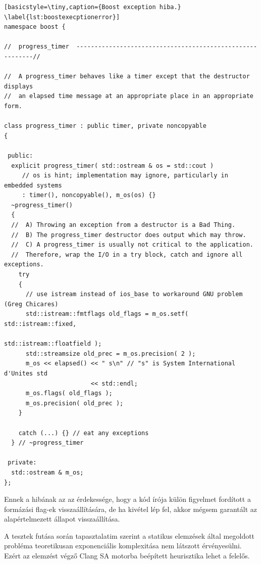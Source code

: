 \documentclass[a4paper,12pt]{report}
\begin{document}
\begin{minipage}{\linewidth}
\begin{lstlisting}[basicstyle=\tiny,caption={Boost exception hiba.}
\label{lst:boostexecptionerror}]
namespace boost {

//  progress_timer  ----------------------------------------------------------//

//  A progress_timer behaves like a timer except that the destructor displays
//  an elapsed time message at an appropriate place in an appropriate form.

class progress_timer : public timer, private noncopyable
{

 public:
  explicit progress_timer( std::ostream & os = std::cout )
     // os is hint; implementation may ignore, particularly in embedded systems
     : timer(), noncopyable(), m_os(os) {}
  ~progress_timer()
  {
  //  A) Throwing an exception from a destructor is a Bad Thing.
  //  B) The progress_timer destructor does output which may throw.
  //  C) A progress_timer is usually not critical to the application.
  //  Therefore, wrap the I/O in a try block, catch and ignore all exceptions.
    try
    {
      // use istream instead of ios_base to workaround GNU problem (Greg Chicares)
      std::istream::fmtflags old_flags = m_os.setf( std::istream::fixed,
                                                   std::istream::floatfield );
      std::streamsize old_prec = m_os.precision( 2 );
      m_os << elapsed() << " s\n" // "s" is System International d'Unites std
                        << std::endl;
      m_os.flags( old_flags );
      m_os.precision( old_prec );
    }

    catch (...) {} // eat any exceptions
  } // ~progress_timer

 private:
  std::ostream & m_os;
}; 
\end{lstlisting}
\end{minipage}

Ennek a hibának az az érdekessége, hogy a kód írója külön figyelmet fordított a formázási flag-ek visszaállítására, de ha kivétel lép fel, akkor mégsem garantált az alapértelmezett állapot visszaállítása.

A tesztek futása során tapasztalatim szerint a statikus elemzések által megoldott probléma teoretikusan exponenciális komplexitása nem látszott érvényesülni. Ezért az elemzést végző Clang SA motorba beépített heurisztika lehet a felelős.
\end{document}
